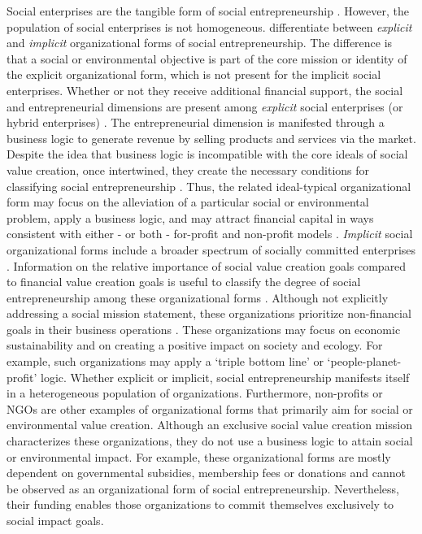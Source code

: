 \documentclass{article}
\begin{document}
Social enterprises are the tangible form of social entrepreneurship \parencite{Mair2006}. However, the population of social enterprises is not homogeneous. \textcite{Lepoutre2013} differentiate between \emph{explicit }and \emph{implicit} organizational forms of social entrepreneurship. The difference is that a social or environmental objective is part of the core mission or identity of the explicit organizational form, which is not present for the implicit social enterprises. Whether or not they receive additional financial support, the social and entrepreneurial dimensions are present among \emph{explicit }social enterprises (or hybrid enterprises) \parencite{Defourny2010}. The entrepreneurial dimension is manifested through a business logic \parencite[][at, ,least, ,to, ,some, ,extent, ,--see]{Lepoutre2013} to generate revenue by selling products and services via the market. Despite the idea that business logic is incompatible with the core ideals of social value creation, once intertwined, they create the necessary conditions for classifying social entrepreneurship \parencite{Defourny2010, Haigh2015, Weerawardena2006}. Thus, the related ideal-typical organizational form may focus on the alleviation of a particular social or environmental problem, apply a business logic, and may attract financial capital in ways consistent with either - or both - for-profit and non-profit models \parencite{Battilana2014, Lepoutre2013}. \emph{Implicit }social organizational forms include a broader spectrum of socially committed enterprises \parencite{Lepoutre2013}. Information on the relative importance of social value creation goals compared to financial value creation goals is useful to classify the degree of social entrepreneurship among these organizational forms \parencite{Bacq2016, Zahra2014}. Although not explicitly addressing a social mission statement, these organizations prioritize non-financial goals in their business operations \parencite{Lepoutre2013}. These organizations may focus on economic sustainability and on creating a positive impact on society and ecology.\emph{ }For example, such organizations may apply a ‘triple bottom line' or ‘people-planet-profit' logic. Whether explicit or implicit, social entrepreneurship manifests itself in a heterogeneous population of organizations. Furthermore, non-profits or NGOs are other examples of organizational forms that primarily aim for social or environmental value creation. Although an exclusive social value creation mission characterizes these organizations, they do not use a business logic to attain social or environmental impact. For example, these organizational forms are mostly dependent on governmental subsidies, membership fees or donations and cannot be observed as an organizational form of social entrepreneurship. Nevertheless, their funding enables those organizations to commit themselves exclusively to social impact goals. 
\end{document}
